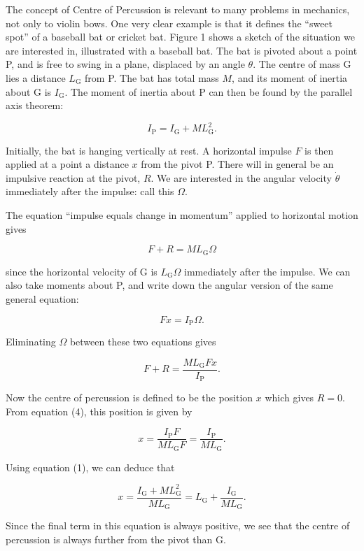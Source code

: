   The concept of Centre of Percussion is relevant to many problems in 
  mechanics, not only to violin bows. One very clear example is that it defines 
  the ``sweet spot'' of a baseball bat or cricket bat. Figure 1 shows a sketch 
  of the situation we are interested in, illustrated with a baseball bat. The 
  bat is pivoted about a point P, and is free to swing in a plane, displaced by 
  an angle $\theta$. The centre of mass G lies a distance $L_{\mathrm{G}}$ from 
  P. The bat has total mass $M$, and its moment of inertia about G is 
  $I_{\mathrm{G}}$. The moment of inertia about P can then be found by the 
  parallel axis theorem: 

  $$I_{\mathrm{P}}=I_{\mathrm{G}}+ML_{\mathrm{G}}^2. \tag{1}$$ 


  Initially, the bat is hanging vertically at rest. A horizontal impulse $F$ is 
  then applied at a point a distance $x$ from the pivot P. There will in 
  general be an impulsive reaction at the pivot, $R$. We are interested in the 
  angular velocity $\dot{\theta}$ immediately after the impulse: call this 
  $\Omega$. 

  The equation ``impulse equals change in momentum'' applied to horizontal 
  motion gives 

  $$F+R=M L_{\mathrm{G}} \Omega \tag{2}$$ 

  since the horizontal velocity of G is $L_{\mathrm{G}} \Omega$ immediately 
  after the impulse. We can also take moments about P, and write down the 
  angular version of the same general equation: 

  $$Fx=I_{\mathrm{P}} \Omega . \tag{3}$$ 

  Eliminating $\Omega$ between these two equations gives 

  $$ F+R=\frac{ML_{\mathrm{G}}Fx}{I_{\mathrm{P}}} . \tag{4}$$ 

  Now the centre of percussion is defined to be the position $x$ which gives 
  $R=0$. From equation (4), this position is given by 

  
  $$x=\frac{I_{\mathrm{P}}F}{ML_{\mathrm{G}}F}=\frac{I_{\mathrm{P}}}{ML_{\mathrm{G}}}. 
  \tag{5}$$ 

  Using equation (1), we can deduce that 

  $$x=\frac{I_{\mathrm{G}}+ML_{\mathrm{G}}^2}{ML_{\mathrm{G}}} = 
  L_{\mathrm{G}}+\frac{I_{\mathrm{G}}}{ML_{\mathrm{G}}}. \tag{6}$$ 

  Since the final term in this equation is always positive, we see that the 
  centre of percussion is always further from the pivot than G. 


